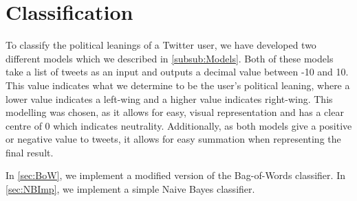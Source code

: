 \chapter{Classification}\label{cha:classification}
To classify the political leanings of a Twitter user, we have developed
two different models which we described in \autoref{subsub:Models}. Both of
these models take a list of tweets as an input and outputs a decimal value
between -10 and 10. This value indicates what we determine to be the user's
political leaning, where a lower value indicates a left-wing and a higher value
indicates right-wing. This modelling was chosen, as it allows for easy, visual
representation and has a clear centre of 0 which indicates neutrality.
Additionally, as both models give a positive or negative value to
tweets, it allows for easy summation when representing the final result.\nl

In \autoref{sec:BoW}, we implement a modified version of the Bag-of-Words
classifier. In \autoref{sec:NBImp}, we implement a simple Naive Bayes
classifier.\nl